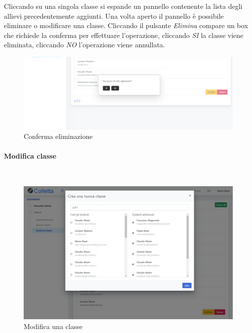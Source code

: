  Cliccando su una singola classe si espande un pannello contenente la lista degli allievi precedentemente aggiunti.
Una volta aperto il pannello è possibile eliminare o modificare una classe.
Cliccando il pulsante \textit{Elimina} compare un box che richiede la conferma per effettuare l'operazione, cliccando \textit{SI} la classe viene eliminata, cliccando \textit{NO} l'operazione viene annullata.
 \begin{figure}[H]
            	\centering
        		\includegraphics[width=17cm]{sez/img/insegnante/confermaElimina.png} 
            	\caption{Conferma eliminazione}\label{fig:1}
        	\end{figure}
     
       
       \newpage
         \paragraph{Modifica classe}\mbox{}\\	      
        
         \begin{figure}[H]
            	\centering
        		\includegraphics[width=17cm]{sez/img/insegnante/modificaclasse.PNG} 
            	\caption{Modifica una classe}\label{fig:1}
        	\end{figure}
        	
